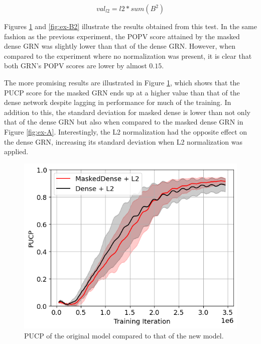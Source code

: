 \documentclass[twocolumn,a4paper,11pt]{article}
\begin{document}
    \begin{equation}
        val_{l2} = l2*sum(B^2)
        \label{eq:l2}
    \end{equation}

    Figures \ref{fig:ex-B} and \ref{fig:ex-B2} illustrate the results obtained from this test. In the same fashion as the previous experiment, the POPV score attained by the masked dense GRN was slightly lower than that of the dense GRN. However, when compared to the experiment where no normalization was present, it is clear that both GRN's POPV scores are lower by almost $0.15$.
    
    The more promising results are illustrated in Figure \ref{fig:ex-B}, which shows that the PUCP score for the masked GRN ends up at a higher value than that of the dense network despite lagging in performance for much of the training. In addition to this, the standard deviation for masked dense is lower than not only that of the dense GRN but also when compared to the masked dense GRN in Figure \ref{fig:ex-A}. Interestingly, the L2 normalization had the opposite effect on the dense GRN, increasing its standard deviation when L2 normalization was applied.

    \begin{figure}[h]
        \centering
        \includegraphics[width=0.8\linewidth]{ex-img/final-l2-pucp.png}
        \caption{PUCP of the original model compared to that of the new model.} \label{fig:ex-B}
    \end{figure}
\end{document}
